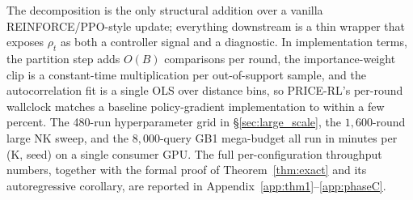 \begin{figure}[t]
\noindent{}
\end{figure}

The decomposition is the only structural addition over a vanilla REINFORCE/PPO-style update; everything downstream is a thin wrapper that exposes $\rho_t$ as both a controller signal and a diagnostic. In implementation terms, the partition step adds $O(B)$ comparisons per round, the importance-weight clip is a constant-time multiplication per out-of-support sample, and the autocorrelation fit is a single OLS over distance bins, so PRICE-RL's per-round wallclock matches a baseline policy-gradient implementation to within a few percent. The 480-run hyperparameter grid in §\ref{sec:large_scale}, the $1{,}600$-round large NK sweep, and the $8{,}000$-query GB1 mega-budget all run in minutes per (K, seed) on a single consumer GPU. The full per-configuration throughput numbers, together with the formal proof of Theorem~\ref{thm:exact} and its autoregressive corollary, are reported in Appendix~\ref{app:thm1}--\ref{app:phaseC}.
